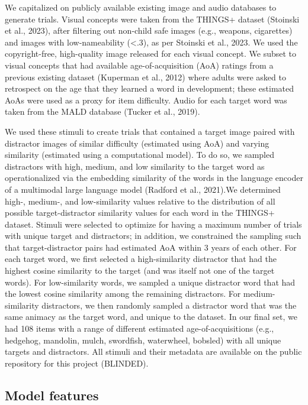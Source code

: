 \documentclass[
  man,mask]{apa6}
\begin{document}
We capitalized on publicly available existing image and audio databases to generate trials. Visual concepts were taken from the THINGS+ dataset (Stoinski et al., 2023), after filtering out non-child safe images (e.g., weapons, cigarettes) and images with low-nameability (\textless.3), as per Stoinski et al., 2023. We used the copyright-free, high-quality image released for each visual concept. We subset to visual concepts that had available age-of-acquisition (AoA) ratings from a previous existing dataset (Kuperman et al., 2012) where adults were asked to retrospect on the age that they learned a word in development; these estimated AoAs were used as a proxy for item difficulty. Audio for each target word was taken from the MALD database (Tucker et al., 2019).

We used these stimuli to create trials that contained a target image paired with distractor images of similar difficulty (estimated using AoA) and varying similarity (estimated using a computational model). To do so, we sampled distractors with high, medium, and low similarity to the target word as operationalized via the embedding similarity of the words in the language encoder of a multimodal large language model (Radford et al., 2021).We determined high-, medium-, and low-similarity values relative to the distribution of all possible target-distractor similarity values for each word in the THINGS+ dataset. Stimuli were selected to optimize for having a maximum number of trials with unique target and distractors; in addition, we constrained the sampling such that target-distractor pairs had estimated AoA within 3 years of each other. For each target word, we first selected a high-similarity distractor that had the highest cosine similarity to the target (and was itself not one of the target words). For low-similarity words, we sampled a unique distractor word that had the lowest cosine similarity among the remaining distractors. For medium-similarity distractors, we then randomly sampled a distractor word that was the same animacy as the target word, and unique to the dataset. In our final set, we had 108 items with a range of different estimated age-of-acquisitions (e.g., hedgehog, mandolin, mulch, swordfish, waterwheel, bobsled) with all unique targets and distractors. All stimuli and their metadata are available on the public repository for this project (BLINDED).

\subsection{Model features}\label{model-features}
\end{document}
